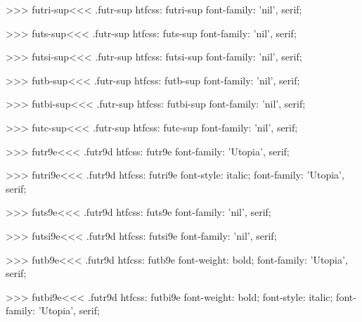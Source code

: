 {>>>
\<futri-sup\><<<
.futr-sup
htfcss:  futri-sup  font-family: 'nil', serif;

>>>
\<futs-sup\><<<
.futr-sup
htfcss:  futs-sup  font-family: 'nil', serif;

>>>
\<futsi-sup\><<<
.futr-sup
htfcss:  futsi-sup  font-family: 'nil', serif;

>>>
\<futb-sup\><<<
.futr-sup
htfcss:  futb-sup  font-family: 'nil', serif;

>>>
\<futbi-sup\><<<
.futr-sup
htfcss:  futbi-sup  font-family: 'nil', serif;

>>>
\<futc-sup\><<<
.futr-sup
htfcss:  futc-sup  font-family: 'nil', serif;

>>>
\<futr9e\><<<
.futr9d
htfcss:  futr9e  font-family: 'Utopia', serif;

>>>
\<futri9e\><<<
.futr9d
htfcss:  futri9e  font-style: italic; font-family: 'Utopia', serif;

>>>
\<futs9e\><<<
.futr9d
htfcss:  futs9e  font-family: 'nil', serif;

>>>
\<futsi9e\><<<
.futr9d
htfcss:  futsi9e  font-family: 'nil', serif;

>>>
\<futb9e\><<<
.futr9d
htfcss:  futb9e  font-weight: bold; font-family: 'Utopia', serif;

>>>
\<futbi9e\><<<
.futr9d
htfcss:  futbi9e  font-weight: bold; font-style: italic; font-family: 'Utopia', serif;

}
